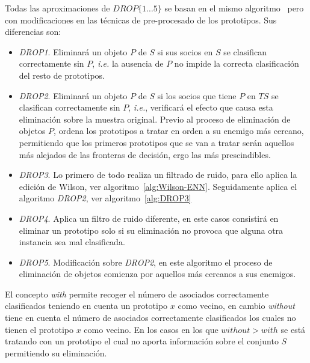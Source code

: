 Todas las aproximaciones de $DROP\lbrace 1\dots5\rbrace$ se basan en el mismo algoritmo~\cite{wilson2000reduction} pero con modificaciones en las técnicas de pre-procesado de los prototipos. Sus diferencias son:
\begin{itemize}
\item \textit{DROP1}. Eliminará un objeto $P$ de $S$ si sus socios en $S$ se clasifican correctamente sin $P$, \textit{i.e.} la ausencia de $P$ no impide la correcta clasificación del resto de prototipos.
\item \textit{DROP2}. Eliminará un objeto $P$ de $S$ si los socios que tiene $P$ en $TS$ se clasifican correctamente sin $P$, \textit{i.e.}, verificará el efecto que causa esta eliminación sobre la muestra original. Previo al proceso de eliminación de objetos $P$, ordena los prototipos a tratar en orden a su enemigo más cercano, permitiendo que los primeros prototipos que se van a tratar serán aquellos más alejados de las fronteras de decisión, ergo las más prescindibles.
\item \textit{DROP3}. Lo primero de todo realiza un filtrado de ruido, para ello aplica la edición de Wilson, ver algoritmo~\ref{alg:Wilson-ENN}. Seguidamente aplica el algoritmo \textit{DROP2}, ver algoritmo~\ref{alg:DROP3}
\item \textit{DROP4}. Aplica un filtro de ruido diferente, en este casos consistirá en eliminar un prototipo solo si su eliminación no provoca que alguna otra instancia sea mal clasificada.
\item \textit{DROP5}. Modificación sobre \textit{DROP2}, en este algoritmo el proceso de eliminación de objetos comienza por aquellos más cercanos a sus enemigos. 
\end{itemize}

El concepto \textit{with} permite recoger el número de asociados correctamente clasificados teniendo en cuenta un prototipo $x$ como vecino, en cambio \textit{without} tiene en cuenta el número de asociados correctamente clasificados los cuales no tienen el prototipo $x$ como vecino. En los casos en los que $without > with$ se está tratando con un prototipo el cual no aporta información sobre el conjunto $S$ permitiendo su eliminación.

